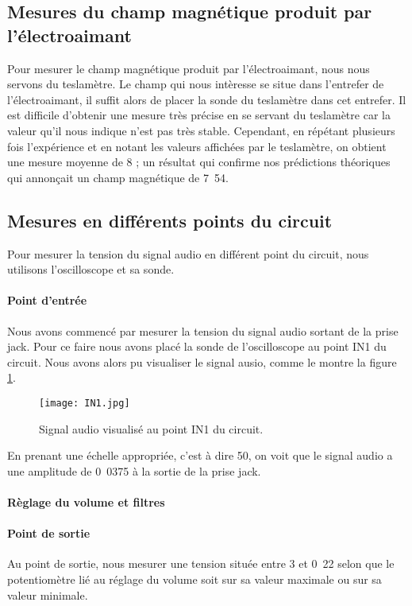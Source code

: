 \subsection{Mesures du champ magnétique produit par l'électroaimant}
Pour mesurer le champ magnétique produit par l'électroaimant, nous nous servons du teslamètre.
Le champ qui nous intèresse se situe dans l'entrefer de l'électroaimant, il suffit alors de placer
la sonde du teslamètre dans cet entrefer. Il est difficile d'obtenir une mesure très précise en se
servant du teslamètre car la valeur qu'il nous indique n'est pas très stable. Cependant, en répétant
plusieurs fois l'expérience et en notant les valeurs affichées par le teslamètre, on obtient une mesure
moyenne de \unit{8}{\centi\tesla} ; un résultat qui confirme nos prédictions théoriques
qui annonçait un champ magnétique de \unit{7.54}{\centi\tesla}.

\subsection{Mesures en différents points du circuit}
Pour mesurer la tension du signal audio en différent point du circuit, nous utilisons l'oscilloscope
et sa sonde.

\paragraph{Point d'entrée}
Nous avons commencé par mesurer la tension du signal audio sortant de la prise jack. Pour ce faire nous avons
placé la sonde de l'oscilloscope au point IN1 du circuit. Nous avons alors pu visualiser le 
signal ausio, comme le montre la figure \ref{in1}.

\begin{figure}[!htb]
	\centering
	\texttt{[image: IN1.jpg]}
	\caption{Signal audio visualisé au point IN1 du circuit.}
	\label{in1}
\end{figure}

En prenant une échelle appropriée, c'est à dire \unit{50}{\milli\volt}, on voit que le signal 
audio a une amplitude de \unit{0.0375}{\volt} à la sortie de la prise jack.

\paragraph{Règlage du volume et filtres}


\paragraph{Point de sortie}
Au point de sortie, nous mesurer une tension située entre \unit{3}{\volt}
et \unit{0.22}{\volt} selon que le potentiomètre lié au réglage du volume
soit sur sa valeur maximale ou sur sa valeur minimale.



